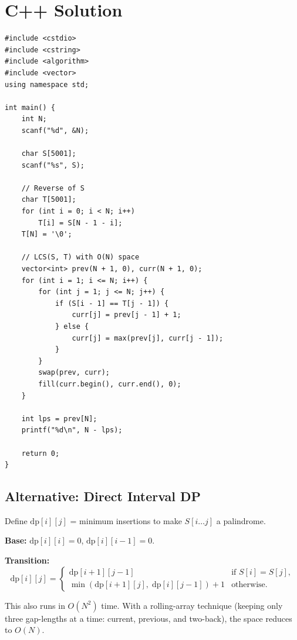 \documentclass[11pt,a4paper]{article}
\begin{document}
\section{C++ Solution}

\begin{lstlisting}
#include <cstdio>
#include <cstring>
#include <algorithm>
#include <vector>
using namespace std;

int main() {
    int N;
    scanf("%d", &N);

    char S[5001];
    scanf("%s", S);

    // Reverse of S
    char T[5001];
    for (int i = 0; i < N; i++)
        T[i] = S[N - 1 - i];
    T[N] = '\0';

    // LCS(S, T) with O(N) space
    vector<int> prev(N + 1, 0), curr(N + 1, 0);
    for (int i = 1; i <= N; i++) {
        for (int j = 1; j <= N; j++) {
            if (S[i - 1] == T[j - 1]) {
                curr[j] = prev[j - 1] + 1;
            } else {
                curr[j] = max(prev[j], curr[j - 1]);
            }
        }
        swap(prev, curr);
        fill(curr.begin(), curr.end(), 0);
    }

    int lps = prev[N];
    printf("%d\n", N - lps);

    return 0;
}
\end{lstlisting}

\subsection{Alternative: Direct Interval DP}

Define $\mathrm{dp}[i][j]$ = minimum insertions to make $S[i \ldots j]$ a palindrome.

\textbf{Base:} $\mathrm{dp}[i][i] = 0$, $\mathrm{dp}[i][i{-}1] = 0$.

\textbf{Transition:}
\[
  \mathrm{dp}[i][j] = \begin{cases}
    \mathrm{dp}[i{+}1][j{-}1] & \text{if } S[i] = S[j], \\
    \min(\mathrm{dp}[i{+}1][j],\; \mathrm{dp}[i][j{-}1]) + 1 & \text{otherwise}.
  \end{cases}
\]

This also runs in $O(N^2)$ time. With a rolling-array technique (keeping only three
gap-lengths at a time: current, previous, and two-back), the space reduces to $O(N)$.
\end{document}
